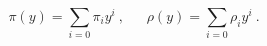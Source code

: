 \begin{equation}
\pi (y)  = \sum \limits _{i=0}^{} {\pi}_i y^i\ , \ \ \ \ \ \ \
\rho (y) = \sum \limits _{i=0}^{} {\rho}_i y^i\ .
\label{2.5}
\end{equation}

